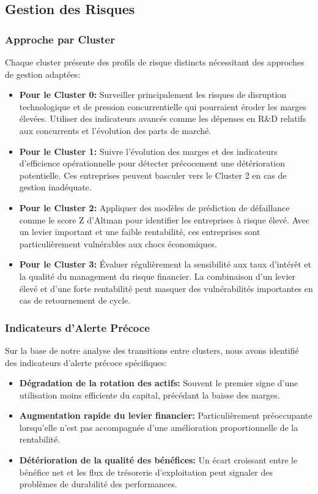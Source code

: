 \subsection{Gestion des Risques}
\subsubsection{Approche par Cluster}
Chaque cluster présente des profils de risque distincts nécessitant des approches de gestion adaptées:

\begin{itemize}
    \item \textbf{Pour le Cluster 0:} Surveiller principalement les risques de disruption technologique et de pression concurrentielle qui pourraient éroder les marges élevées. Utiliser des indicateurs avancés comme les dépenses en R\&D relatifs aux concurrents et l'évolution des parts de marché.
    
    \item \textbf{Pour le Cluster 1:} Suivre l'évolution des marges et des indicateurs d'efficience opérationnelle pour détecter précocement une détérioration potentielle. Ces entreprises peuvent basculer vers le Cluster 2 en cas de gestion inadéquate.
    
    \item \textbf{Pour le Cluster 2:} Appliquer des modèles de prédiction de défaillance comme le score Z d'Altman pour identifier les entreprises à risque élevé. Avec un levier important et une faible rentabilité, ces entreprises sont particulièrement vulnérables aux chocs économiques.
    
    \item \textbf{Pour le Cluster 3:} Évaluer régulièrement la sensibilité aux taux d'intérêt et la qualité du management du risque financier. La combinaison d'un levier élevé et d'une forte rentabilité peut masquer des vulnérabilités importantes en cas de retournement de cycle.
\end{itemize}

\subsubsection{Indicateurs d'Alerte Précoce}
Sur la base de notre analyse des transitions entre clusters, nous avons identifié des indicateurs d'alerte précoce spécifiques:

\begin{itemize}
    \item \textbf{Dégradation de la rotation des actifs:} Souvent le premier signe d'une utilisation moins efficiente du capital, précédant la baisse des marges.
    
    \item \textbf{Augmentation rapide du levier financier:} Particulièrement préoccupante lorsqu'elle n'est pas accompagnée d'une amélioration proportionnelle de la rentabilité.
    
    \item \textbf{Détérioration de la qualité des bénéfices:} Un écart croissant entre le bénéfice net et les flux de trésorerie d'exploitation peut signaler des problèmes de durabilité des performances.
\end{itemize}

